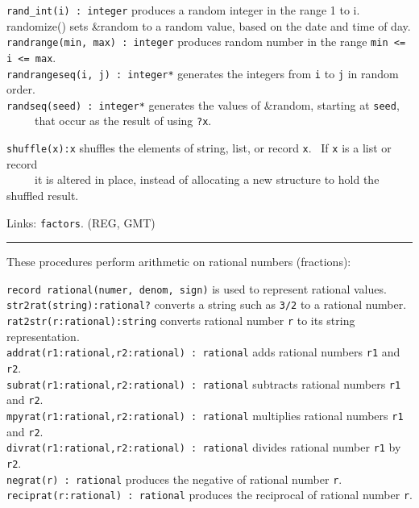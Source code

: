 \texttt{rand\_int(i) : integer} produces a random integer in the range 1
to i.\\
randomize() sets \&random to a
{\textquotedbl}random{\textquotedbl} value, based on the date and time
of day. \\
\texttt{randrange(min, max) : integer} produces random number in the
range \texttt{min {\textless}= i {\textless}= max}.\\
\texttt{randrangeseq(i, j) : integer*} generates the integers from
\texttt{i} to \texttt{j} in random order.\\
\texttt{randseq(seed) : integer*} generates the values of \&random,
starting at \texttt{seed},\\
 \ \ \ \ \ that occur as the result of using \texttt{?x}.

\texttt{shuffle(x):x} shuffles the elements of string, list, or record
\texttt{x}. \ If \texttt{x} is a list or record\\
 \ \ \ \ \ it is altered in place, instead of allocating a new structure
to hold the shuffled result.

Links: \texttt{factors}. (REG, GMT)

\vspace{0.25cm}\hrule{}

These procedures perform arithmetic on rational
numbers (fractions):

\texttt{record rational(numer, denom, sign)} is used to represent
rational values.\\
\texttt{str2rat(string):rational?} converts a string such as
\texttt{{\textquotedbl}3/2{\textquotedbl}} to a rational
number.\\
\texttt{rat2str(r:rational):string} converts rational number \texttt{r}
to its string representation.\\
\texttt{addrat(r1:rational,r2:rational) : rational} adds rational
numbers \texttt{r1} and \texttt{r2}.\\
\texttt{subrat(r1:rational,r2:rational) : rational} subtracts rational
numbers \texttt{r1} and \texttt{r2}.\\
\texttt{mpyrat(r1:rational,r2:rational) : rational} multiplies rational
numbers \texttt{r1} and \texttt{r2}.\\
\texttt{divrat(r1:rational,r2:rational) : rational} divides rational
number \texttt{r1} by \texttt{r2}.\\
\texttt{negrat(r) : rational} produces the negative of rational number
\texttt{r}.\\
\texttt{reciprat(r:rational) : rational} produces the reciprocal of
rational number \texttt{r}.

